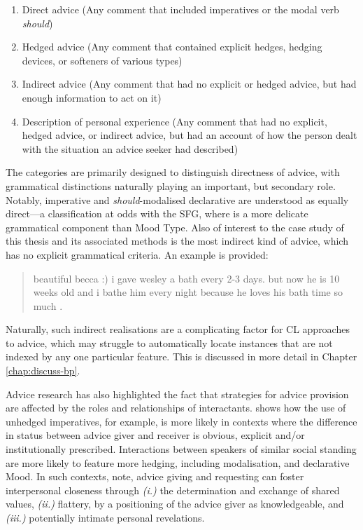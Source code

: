 \begin{enumerate}\small
\item Direct advice (Any comment that included imperatives or the modal verb \emph{should})
\item Hedged advice (Any comment that contained explicit hedges, hedging devices, or softeners of various types)
\item Indirect advice (Any comment that had no explicit or hedged advice, but had enough information to act on it)
\item Description of personal experience (Any comment that had no explicit, hedged advice, or indirect advice, but had an account of how the person dealt with the situation an advice seeker had described) \cite[adapted from][p.~7]{kouper_pragmatics_2010}
\end{enumerate}
%
The categories are primarily designed to distinguish directness of advice, with grammatical distinctions naturally playing an important, but secondary role. Notably, imperative and \emph{should}-modalised declarative are understood as equally direct---a classification at odds with the \gls{SFG}, where  is a more delicate grammatical component than Mood Type. Also of interest to the case study of this thesis and its associated methods is the most indirect kind of advice, which has no explicit grammatical criteria. An example is provided:

\begin{quote}\singlespacing\small
beautiful becca :) i gave wesley a bath every 2-3 days. but now he is 10 weeks old and i bathe him every night because he loves his bath time so much  \textcite[p.~13]{kouper_pragmatics_2010}.
\end{quote}
%
Naturally, such indirect realisations are a complicating factor for \gls{CL} approaches to advice, which may struggle to automatically locate instances that are not indexed by any one particular  feature. This is discussed in more detail in Chapter \ref{chap:discuss-bp}.

Advice research has also highlighted the fact that strategies for advice provision are affected by the roles and relationships of interactants. \textcite{decapua_`if_1995} shows how the use of unhedged imperatives, for example, is more likely in contexts where the difference in status between advice giver and receiver is obvious, explicit and\slash or institutionally prescribed. Interactions between speakers of similar social standing are more likely to feature more hedging, including modalisation, and declarative Mood. In such contexts, \citeauthor{decapua_`if_1995} note, advice giving and requesting can foster interpersonal closeness through \emph{(i.)} the determination and exchange of shared values, \emph{(ii.)} flattery, by a positioning of the advice giver as knowledgeable, and \emph{(iii.)} potentially intimate personal revelations.

